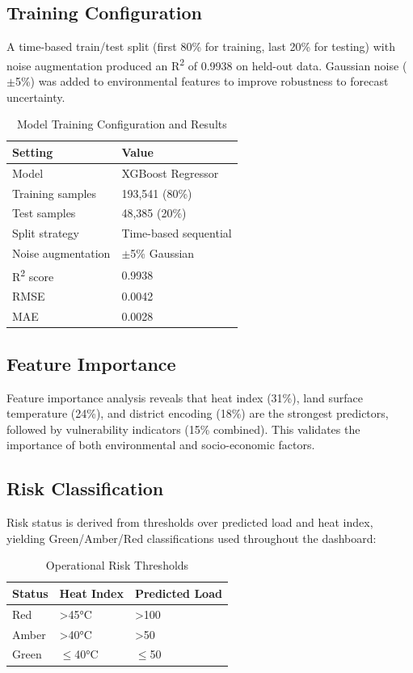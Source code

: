 \documentclass[conference]{IEEEtran}
\begin{document}
\subsection{Training Configuration}
A time-based train/test split (first 80\% for training, last 20\% for testing) with noise augmentation produced an R\textsuperscript{2} of 0.9938 on held-out data. Gaussian noise ($\pm$5\%) was added to environmental features to improve robustness to forecast uncertainty.

\begin{table}[htbp]
\centering
\caption{Model Training Configuration and Results}
\begin{tabular}{@{}ll@{}}
\toprule
\textbf{Setting} & \textbf{Value} \\
\midrule
Model & XGBoost Regressor \\
Training samples & 193,541 (80\%) \\
Test samples & 48,385 (20\%) \\
Split strategy & Time-based sequential \\
Noise augmentation & $\pm$5\% Gaussian \\
R\textsuperscript{2} score & 0.9938 \\
RMSE & 0.0042 \\
MAE & 0.0028 \\
\bottomrule
\end{tabular}
\label{tab:training}
\end{table}

\subsection{Feature Importance}
Feature importance analysis reveals that heat index (31\%), land surface temperature (24\%), and district encoding (18\%) are the strongest predictors, followed by vulnerability indicators (15\% combined). This validates the importance of both environmental and socio-economic factors.

\subsection{Risk Classification}
Risk status is derived from thresholds over predicted load and heat index, yielding Green/Amber/Red classifications used throughout the dashboard:

\begin{table}[htbp]
\centering
\caption{Operational Risk Thresholds}
\begin{tabular}{@{}lll@{}}
\toprule
\textbf{Status} & \textbf{Heat Index} & \textbf{Predicted Load} \\
\midrule
Red & >45°C & >100 \\
Amber & >40°C & >50 \\
Green & $\leq$40°C & $\leq$50 \\
\bottomrule
\end{tabular}
\label{tab:thresholds}
\end{table}
\end{document}
